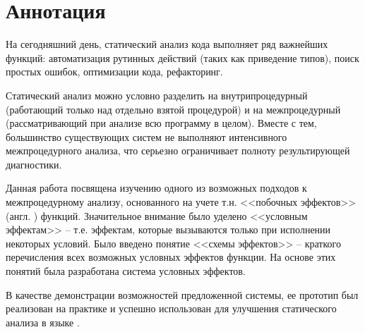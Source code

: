 \section*{Аннотация}

На сегодняшний день, статический анализ кода выполняет ряд важнейших функций: автоматизация рутинных действий (таких как приведение типов), поиск простых ошибок, оптимизации кода, рефакторинг.

Статический анализ можно условно разделить на внутрипроцедурный (работающий только над отдельно взятой процедурой) и на межпроцедурный (рассматривающий при анализе всю программу в целом). Вместе с тем, большинство существующих систем не выполняют интенсивного межпроцедурного анализа, что серьезно ограничивает полноту результирующей диагностики.

Данная работа посвящена изучению одного из возможных подходов к межпроцедурному анализу, основанного на учете т.н. <<побочных эффектов>> (англ. ) функций. Значительное внимание было уделено <<условным эффектам>> -- т.е. эффектам, которые вызываются только при исполнении некоторых условий. Было введено понятие <<схемы эффектов>> -- краткого перечисления всех возможных условных эффектов функции. На основе этих понятий была разработана система условных эффектов.

В качестве демонстрации возможностей предложенной системы, ее прототип был реализован на практике и успешно использован для улучшения статического анализа в языке .
